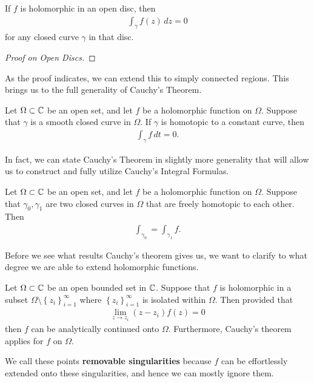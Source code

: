 \documentclass{memoir}
\begin{document}
\begin{cor}
	If \(f\) is holomorphic in an open disc, then
	\begin{align*}
		\int_\gamma f(z) \,d z = 0
	\end{align*}
	for any closed curve \(\gamma\) in that disc.
\end{cor}

\begin{proof}[Proof on Open Discs]%
	
\end{proof}

As the proof indicates, we can extend this to simply connected regions. This brings us to the full generality of Cauchy's Theorem.

\begin{thm}
	Let \(\Omega \subset \mathbb{C}\) be an open set, and let \(f\) be a holomorphic function on \(\Omega \). Suppose that \(\gamma \) is a smooth closed curve in \(\Omega \). If \(\gamma \) is homotopic to a constant curve, then
	\begin{align*}
		\int_\gamma f \,d t = 0.
	\end{align*}
\end{thm}

In fact, we can state Cauchy's Theorem in slightly more generality that will allow us to construct and fully utilize Cauchy's Integral Formulas.

\begin{cor}
	Let \(\Omega \subset \mathbb{C}\) be an open set, and let \(f\) be a holomorphic function on \(\Omega \). Suppose that \(\gamma_0,\gamma_1\) are two closed curves in \(\Omega \) that are freely homotopic to each other. Then
	\begin{align*}
		\int_{\gamma_0} = \int_{\gamma_1}f.
	\end{align*}
\end{cor}

Before we see what results Cauchy's theorem gives us, we want to clarify to what degree we are able to extend holomorphic functions.

\begin{prop}
	Let \(\Omega \subset \mathbb{C}\) be an open bounded set in \(\mathbb{C}\). Suppose that \(f\) is holomorphic in a subset \(\Omega \setminus \left\{ z_i \right\}_{i=1}^{\infty}\) where \(\left\{ z_i \right\}_{i=1}^{\infty}\) is isolated within \(\Omega \). Then provided that
	\begin{align*}
		\lim_{z \to z_i} (z-z_i)f(z) = 0
	\end{align*}
	then \(f\) can be analytically continued onto \(\Omega \). Furthermore, Cauchy's theorem applies for \(f\) on \(\Omega \).
\end{prop}
We call these points \textbf{removable singularities} because \(f\) can be effortlessly extended onto these singularities, and hence we can mostly ignore them.
\end{document}
